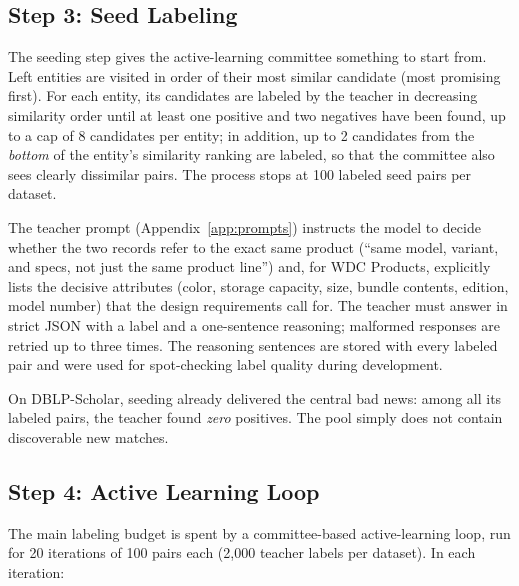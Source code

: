 \documentclass[a4paper,oneside,bibliography=totoc]{scrbook}
\begin{document}
\subsection{Step 3: Seed Labeling}
\label{sec:method_llm_seed}

The seeding step gives the active-learning committee something to start from. Left entities are visited in order of their most similar candidate (most promising first). For each entity, its candidates are labeled by the teacher in decreasing similarity order until at least one positive and two negatives have been found, up to a cap of 8 candidates per entity; in addition, up to 2 candidates from the \emph{bottom} of the entity's similarity ranking are labeled, so that the committee also sees clearly dissimilar pairs. The process stops at 100 labeled seed pairs per dataset.

The teacher prompt (Appendix~\ref{app:prompts}) instructs the model to decide whether the two records refer to the exact same product (``same model, variant, and specs, not just the same product line'') and, for WDC Products, explicitly lists the decisive attributes (color, storage capacity, size, bundle contents, edition, model number) that the design requirements call for. The teacher must answer in strict JSON with a label and a one-sentence reasoning; malformed responses are retried up to three times. The reasoning sentences are stored with every labeled pair and were used for spot-checking label quality during development.

On DBLP-Scholar, seeding already delivered the central bad news: among all its labeled pairs, the teacher found \emph{zero} positives. The pool simply does not contain discoverable new matches.

\subsection{Step 4: Active Learning Loop}
\label{sec:method_llm_al}

The main labeling budget is spent by a committee-based active-learning loop, run for 20 iterations of 100 pairs each (2{,}000 teacher labels per dataset). In each iteration:
\end{document}
